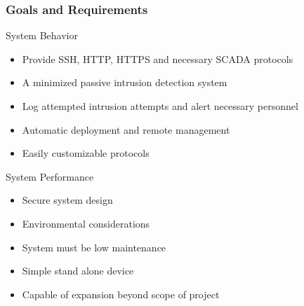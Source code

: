\begin{frame}
\frametitle{Goals and Requirements}

System Behavior
\begin{itemize}
\item Provide SSH, HTTP, HTTPS and necessary SCADA protocols 
\item A minimized passive intrusion detection system
\item Log attempted intrusion attempts and alert necessary personnel 
\item Automatic deployment and remote management
\item Easily customizable protocols
\end{itemize}


System Performance
\begin{itemize}
\item Secure system design
\item Environmental considerations
\item System must be low maintenance
\item Simple stand alone device
\item Capable of expansion beyond scope of project
\end{itemize}

\end{frame}
